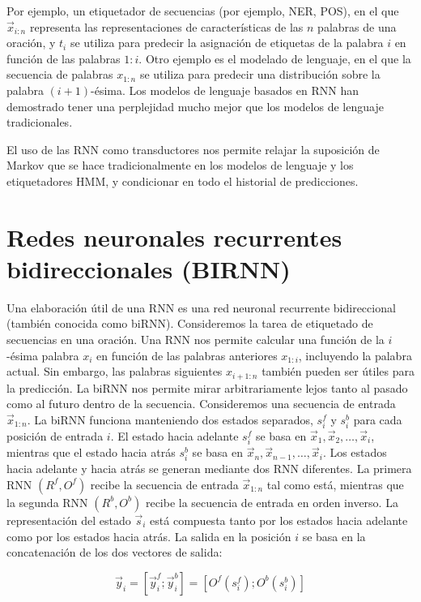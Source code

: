 Por ejemplo, un etiquetador de secuencias (por ejemplo, NER, POS), en el que $\vec{x}_{i:n}$ representa las representaciones de características de las $n$ palabras de una oración, y $t_i$ se utiliza para predecir la asignación de etiquetas de la palabra $i$ en función de las palabras $1:i$. Otro ejemplo es el modelado de lenguaje, en el que la secuencia de palabras $x_{1:n}$ se utiliza para predecir una distribución sobre la palabra $(i+1)$-ésima. Los modelos de lenguaje basados en RNN han demostrado tener una perplejidad mucho mejor que los modelos de lenguaje tradicionales.

El uso de las RNN como transductores nos permite relajar la suposición de Markov que se hace tradicionalmente en los modelos de lenguaje y los etiquetadores HMM, y condicionar en todo el historial de predicciones.

\section{Redes neuronales recurrentes bidireccionales (BIRNN)}

Una elaboración útil de una RNN es una red neuronal recurrente bidireccional (también conocida como biRNN). Consideremos la tarea de etiquetado de secuencias en una oración. Una RNN nos permite calcular una función de la $i$-ésima palabra $x_i$ en función de las palabras anteriores $x_{1:i}$, incluyendo la palabra actual. Sin embargo, las palabras siguientes $x_{i+1:n}$ también pueden ser útiles para la predicción. La biRNN nos permite mirar arbitrariamente lejos tanto al pasado como al futuro dentro de la secuencia. Consideremos una secuencia de entrada $\vec{x}_{1:n}$. La biRNN funciona manteniendo dos estados separados, $s_{i}^{f}$ y $s_{i}^{b}$ para cada posición de entrada $i$. El estado hacia adelante $s_{i}^{f}$ se basa en $\vec{x}_1, \vec{x}_2, \dots ,\vec{x}_i$, mientras que el estado hacia atrás $s_{i}^{b}$ se basa en $\vec{x}_n, \vec{x}_{n-1}, \dots ,\vec{x}_i$. Los estados hacia adelante y hacia atrás se generan mediante dos RNN diferentes. La primera RNN $(R^f, O^f)$ recibe la secuencia de entrada $\vec{x}_{1:n}$ tal como está, mientras que la segunda RNN $(R^b , O^b)$ recibe la secuencia de entrada en orden inverso. La representación del estado $\vec{s}_i$ está compuesta tanto por los estados hacia adelante como por los estados hacia atrás. La salida en la posición $i$ se basa en la concatenación de los dos vectores de salida:

\begin{displaymath}
\vec{y}_i = [\vec{y}_{i}^{f};\vec{y}_{i}^{b}]=[O^{f}(s_{i}^{f});O^{b}(s_{i}^{b})]
\end{displaymath}


